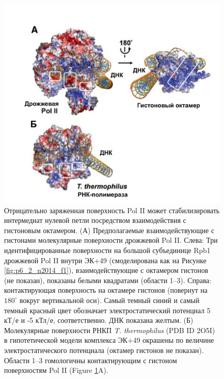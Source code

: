 \begin{figure} [H]
    \centering
    \includegraphics{images/p6/p6_2/p6_2_nar2014_f2.pdf}
    \caption[Отрицательно заряженная поверхность Pol II может стабилизировать интермедиат нулевой петли посредством взаимодействия с гистоновым октамером]{Отрицательно заряженная поверхность Pol II может стабилизировать интермедиат нулевой петли посредством взаимодействия с гистоновым октамером. (А) Предполагаемые взаимодействующие с гистонами молекулярные поверхности дрожжевой Pol II. Слева: Три идентифицированные поверхности на большой субъединице Rpb1 дрожжевой Pol II внутри ЭК+49 (смоделирована как на Рисунке \ref{fig:p6_2_n2014_f1}), взаимодействующие с октамером гистонов (не показан), показаны белыми квадратами (области 1–3). Справа: контактирующая поверхность на октамере гистонов (повернут на $180^{\circ}$ вокруг вертикальной оси). Самый темный синий и самый темный красный цвет обозначает электростатический потенциал 5 кТ/е и -5 кТл/е, соответственно. ДНК показана желтым. (Б) Молекулярные поверхности РНКП \textit{T. thermophilus} (PDB ID 2O5I) в гипотетической модели комплекса ЭК+49 окрашены по величине электростатического потенциала (октамер гистонов не показан). Области 1–3 гомологичны контактирующим с гистоном поверхностям Pol II (Figure \ref{fig:p6_2_n2014_f2}A).}
    \label{fig:p6_2_n2014_f2}
\end{figure}

